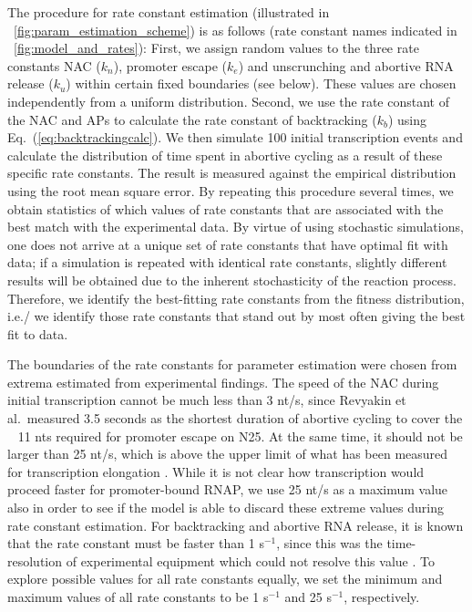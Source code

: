 The procedure for rate constant estimation (illustrated in
\FIG~\ref{fig:param_estimation_scheme}) is as follows (rate constant names
indicated in \FIG~\ref{fig:model_and_rates}): First, we assign random values
to the three rate constants NAC ($k_n$), promoter escape ($k_e$) and
unscrunching and abortive RNA release ($k_u$) within certain fixed boundaries
(see below). These values are chosen independently from a uniform
distribution. Second, we use the rate constant of the NAC and APs to
calculate the rate constant of backtracking ($k_b$) using
Eq.~(\ref{eq:backtrackingcalc}). We then simulate 100 initial transcription
events and calculate the distribution of time spent in abortive cycling as a
result of these specific rate constants. The result is measured against the
empirical distribution \cite{revyakin_abortive_2006} using the root mean
square error. By repeating this procedure several times, we obtain statistics
of which values of rate constants that are associated with the best match with
the experimental data. By virtue of using stochastic simulations, one does not
arrive at a unique set of rate constants that have optimal fit with data; if a
simulation is repeated with identical rate constants, slightly different
results will be obtained due to the inherent stochasticity of the reaction
process. Therefore, we identify the best-fitting rate constants from the
fitness distribution, i.e./ we identify those rate constants that stand out
by most often giving the best fit to data.

The boundaries of the rate constants for parameter estimation were chosen from
extrema estimated from experimental findings. The speed of the NAC during initial
transcription cannot be much less than 3 nt/s, since Revyakin et al.\ measured
3.5 seconds as the shortest duration of abortive cycling
\cite{revyakin_abortive_2006} to cover the ~ 11 nts required for promoter
escape on N25. At the same time, it should not be larger than 25 nt/s,
which is above the upper limit of what has been measured for transcription
elongation \cite{bai_mechanochemical_2007}. While it is not clear how
transcription would proceed faster for promoter-bound RNAP, we use 25 nt/s as
a maximum value also in order to see if the model is able to discard these
extreme values during rate constant estimation. For backtracking and abortive
RNA release, it is known that the rate constant must be faster than 1
s$^{-1}$, since this was the time-resolution of experimental equipment which
could not resolve this value \cite{revyakin_abortive_2006}. To explore
possible values for all rate constants equally, we set the minimum and maximum
values of all rate constants to be 1 s$^{-1}$ and 25 s$^{-1}$, respectively. 

